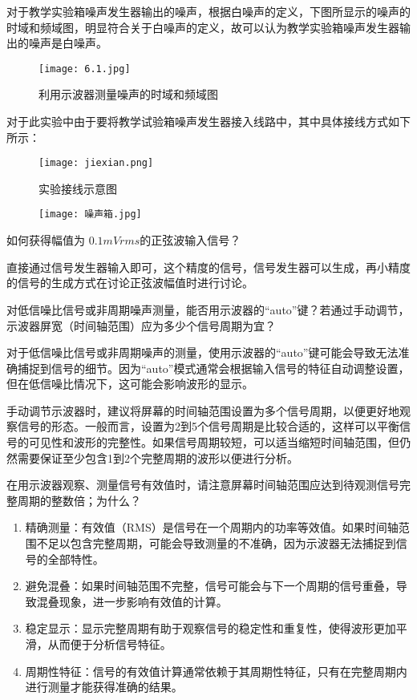 \documentclass[dvipsnames, svgnames,a4paper,11pt]{article}
\begin{document}
对于教学实验箱噪声发生器输出的噪声，根据白噪声的定义，下图所显示的噪声的时域和频域图，明显符合关于白噪声的定义，故可以认为教学实验箱噪声发生器输出的噪声是白噪声。
\begin{figure}[htbp]
	\centering
	\texttt{[image: 6.1.jpg]}
	\caption{利用示波器测量噪声的时域和频域图}
	\label{内利用示波器测量噪声的时域和频域图}
	\end{figure}
	对于此实验中由于要将教学试验箱噪声发生器接入线路中，其中具体接线方式如下所示：
	\begin{figure}[{H}]
		\centering
		\texttt{[image: jiexian.png]}
		\caption{实验接线示意图}
		\label{}
	\end{figure}
	\begin{figure}[{H}]
		\centering
		\texttt{[image: 噪声箱.jpg]}
		\caption{}
		\label{}
	\end{figure}
	\begin{question}
		如何获得幅值为 $0.1mVrms $的正弦波输入信号？
	\end{question}
直接通过信号发生器输入即可，这个精度的信号，信号发生器可以生成，再小精度的信号的生成方式在讨论正弦波幅值时进行讨论。
\begin{question}
	对低信噪比信号或非周期噪声测量，能否用示波器的“auto”键？若通过手动调节，示波器屏宽（时间轴范围）应为多少个信号周期为宜？
\end{question}
对于低信噪比信号或非周期噪声的测量，使用示波器的“auto”键可能会导致无法准确捕捉到信号的细节。因为“auto”模式通常会根据输入信号的特征自动调整设置，但在低信噪比情况下，这可能会影响波形的显示。

手动调节示波器时，建议将屏幕的时间轴范围设置为多个信号周期，以便更好地观察信号的形态。一般而言，设置为2到5个信号周期是比较合适的，这样可以平衡信号的可见性和波形的完整性。如果信号周期较短，可以适当缩短时间轴范围，但仍然需要保证至少包含1到2个完整周期的波形以便进行分析。

	\begin{question}
		在用示波器观察、测量信号有效值时，请注意屏幕时间轴范围应达到待观测信号完整周期的整数倍；为什么？
	\end{question}
\begin{enumerate}
	\item  精确测量：有效值（RMS）是信号在一个周期内的功率等效值。如果时间轴范围不足以包含完整周期，可能会导致测量的不准确，因为示波器无法捕捉到信号的全部特性。
	\item  避免混叠：如果时间轴范围不完整，信号可能会与下一个周期的信号重叠，导致混叠现象，进一步影响有效值的计算。
	\item 稳定显示：显示完整周期有助于观察信号的稳定性和重复性，使得波形更加平滑，从而便于分析信号特征。
	\item 周期性特征：信号的有效值计算通常依赖于其周期性特征，只有在完整周期内进行测量才能获得准确的结果。
\end{enumerate}
\end{document}
